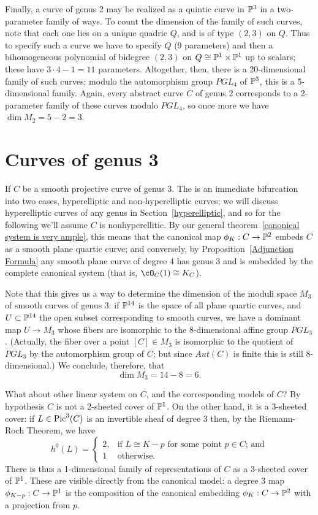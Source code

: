 Finally, a curve of genus 2 may be realized as a quintic curve in $\PP^3$ in a two-parameter family of ways. To count the dimension of the family of such curves, note that each one lies on a unique quadric $Q$, and is of type $(2,3)$ on $Q$. Thus to specify such a curve we have to specify $Q$ (9 parameters) and then a bihomogeneous polynomial of bidegree $(2,3)$ on $Q \cong \PP^1 \times \PP^1$ up to scalars; these have $3\cdot 4 - 1 = 11$ parameters. Altogether, then, there is a 20-dimensional family of such curves; modulo the automorphism group $PGL_4$ of $\PP^3$, this is a 5-dimensional family. Again, every abstract curve $C$ of genus 2 corresponds to a 2-parameter family of these curves modulo $PGL_4$, so once more we have $\dim M_2 = 5 - 2 = 3$.

\section{Curves of genus 3}

If $C$ be a smooth projective curve of genus 3. The is an immediate bifurcation into two cases, hyperelliptic and non-hyperelliptic curves; we will discuss hyperelliptic curves of any genus in Section~\ref{hyperelliptic}, and so for the following we'll assume $C$ is nonhyperellitic. By our general theorem~\ref{canonical system is very ample}, this means that the canonical map $\phi_K : C \to \PP^2$ embeds $C$ as a smooth plane quartic curve; and conversely, by Proposition~\ref{Adjunction Formula} any smooth plane curve of degree 4 has genus 3 and is embedded by the complete canonical system (that is, $\cO_C(1) \cong K_C$). 

Note that this gives us a way to determine the dimension of the moduli space $M_3$ of smooth curves of genus $3$: if $\PP^{14}$ is the space of all plane quartic curves, and $U \subset \PP^{14}$ the open subset corresponding to smooth curves, we have a dominant map $U \to M_3$ whose fibers are isomorphic to the 8-dimensional affine group $PGL_3$. (Actually, the fiber over a point $[C] \in M_3$ is isomorphic to the quotient of $PGL_3$ by the automorphism group of $C$; but since $Aut(C)$ is finite this is still 8-dimensional.) We conclude, therefore, that
$$
\dim M_3 = 14 - 8 = 6.
$$

What about other linear system on $C$, and the corresponding models of $C$? By hypothesis $C$ is not a 2-sheeted cover of $\PP^1$. On the other hand, it is a 3-sheeted cover: if $L \in \pic^3(C)$ is an invertible sheaf of degree 3 then, by the Riemann-Roch Theorem, we have
$$
h^0(L) = 
\begin{cases}
2, &\text{if $L \cong K-p$ for some point $p \in C$; and} \\
1 &\text{otherwise.}
\end{cases}
$$
There is thus a 1-dimensional family of representations of $C$ as a 3-sheeted cover of $\PP^1$. These are  visible directly from the canonical model: a degree 3 map $\phi_{K-p} : C \to \PP^1$ is the composition of the canonical embedding $\phi_K : C \to \PP^2$ with a projection from $p$. 

